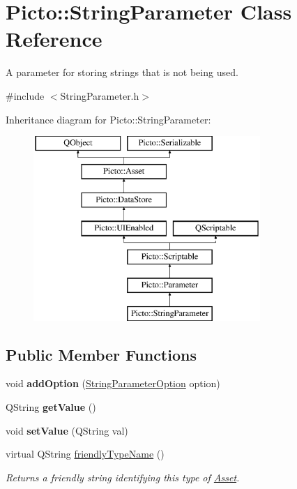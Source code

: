 \hypertarget{class_picto_1_1_string_parameter}{\section{Picto\-:\-:String\-Parameter Class Reference}
\label{class_picto_1_1_string_parameter}
}


A parameter for storing strings that is not being used.  




{\ttfamily \#include $<$String\-Parameter.\-h$>$}

Inheritance diagram for Picto\-:\-:String\-Parameter\-:\begin{figure}[H]
\begin{center}
\leavevmode
\includegraphics[height=7.000000cm]{class_picto_1_1_string_parameter}
\end{center}
\end{figure}
\subsection*{Public Member Functions}
\begin{DoxyCompactItemize}
\item 
\hypertarget{class_picto_1_1_string_parameter_afe6c7b7ceb0966f4ed31f5fbd1355b8d}{void {\bfseries add\-Option} (\hyperlink{struct_picto_1_1_string_parameter_option}{String\-Parameter\-Option} option)}\label{class_picto_1_1_string_parameter_afe6c7b7ceb0966f4ed31f5fbd1355b8d}

\item 
\hypertarget{class_picto_1_1_string_parameter_a439cde56cc8a6b77aaf485e525b40e8e}{Q\-String {\bfseries get\-Value} ()}\label{class_picto_1_1_string_parameter_a439cde56cc8a6b77aaf485e525b40e8e}

\item 
\hypertarget{class_picto_1_1_string_parameter_a0064230c4a9619b8c14b3546351f7c47}{void {\bfseries set\-Value} (Q\-String val)}\label{class_picto_1_1_string_parameter_a0064230c4a9619b8c14b3546351f7c47}

\item 
virtual Q\-String \hyperlink{class_picto_1_1_string_parameter_a4127d8059f5243fc0ec02605fd40a804}{friendly\-Type\-Name} ()
\begin{DoxyCompactList}\small\item\em Returns a friendly string identifying this type of \hyperlink{class_picto_1_1_asset}{Asset}. \end{DoxyCompactList}\end{DoxyCompactItemize}
